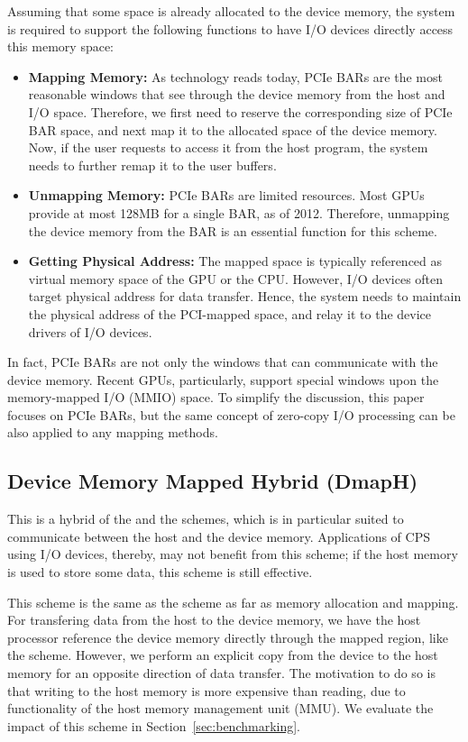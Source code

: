 Assuming that some space is already allocated to the device
memory, the system is required to support the following functions to have I/O
devices directly access this memory space:

\begin{itemize}
 \item \textbf{Mapping Memory:}
       As technology reads today, PCIe BARs are the most reasonable
       windows that see through the device memory from the host and I/O
       space.
       Therefore, we first need to reserve the corresponding size of
       PCIe BAR space, and next map it to the allocated space of the
       device memory.
       Now, if the user requests to access it from the host program, the
       system needs to further remap it to the user buffers.
 \item \textbf{Unmapping Memory:}
       PCIe BARs are limited resources. Most GPUs provide at most 128MB
       for a single BAR, as of 2012.
       Therefore, unmapping the device memory from the BAR is an essential
       function for this scheme.
 \item \textbf{Getting Physical Address:}
       The mapped space is typically referenced as virtual memory space
       of the GPU or the CPU.
       However, I/O devices often target physical address for data transfer.
       Hence, the system needs to maintain the physical address of the
       PCI-mapped space, and relay it to the device drivers of I/O devices.
\end{itemize}

In fact, PCIe BARs are not only the windows that can communicate with
the device memory.
Recent GPUs, particularly, support special windows upon the
memory-mapped I/O (MMIO) space.
To simplify the discussion, this paper focuses on PCIe BARs, but the
same concept of zero-copy I/O processing can be also applied to any
mapping methods.

\subsection{Device Memory Mapped Hybrid (DmapH)}
\label{sec:dmh}

This is a hybrid of the {\dm} and the {\hd} schemes, which is in
particular suited to communicate between the host and the device
memory.
Applications of CPS using I/O devices, thereby, may not benefit from
this scheme; if the host memory is used to store some data, this scheme
is still effective.

This scheme is the same as the {\dm} scheme as far as memory allocation
and mapping.
For transfering data from the host to the device memory, we have the
host processor reference the device memory directly through the
mapped region, like the {\dm} scheme.
However, we perform an explicit copy from the device to the host memory
for an opposite direction of data transfer.
The motivation to do so is that writing to the host memory is more
expensive than reading, due to functionality of the host memory
management unit (MMU).
We evaluate the impact of this scheme in Section~\ref{sec:benchmarking}.
